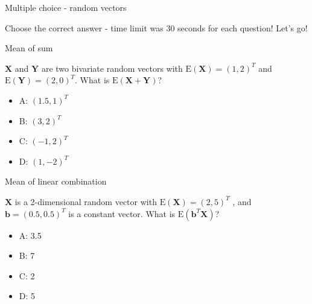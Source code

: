\documentclass[ignorenonframetext,]{beamer}
\providecommand{\tightlist}{%
  \setlength{\itemsep}{0pt}\setlength{\parskip}{0pt}}
\begin{document}
\begin{frame}

\begin{block}{Multiple choice - random vectors}

Choose the correct answer - time limit was 30 seconds for each question!
Let's go!

\begin{block}{Mean of sum}

\(\mathbf{X}\) and \(\mathbf{Y}\) are two bivariate random vectors with
\(\text{E}(\mathbf{X})=(1,2)^T\) and \(\text{E}(\mathbf{Y})=(2,0)^T\).
What is \(\text{E}(\mathbf{X}+\mathbf{Y})\)?

\begin{itemize}
\tightlist
\item
  A: \((1.5,1)^T\)
\item
  B: \((3,2)^T\)
\item
  C: \((-1,2)^ T\)
\item
  D: \((1,-2)^T\)
\end{itemize}

\end{block}

\end{block}

\end{frame}

\begin{frame}

\begin{block}{Mean of linear combination}

\(\mathbf{X}\) is a 2-dimensional random vector with
\(\text{E}(\mathbf{X})=(2,5)^T\) , and \(\mathbf{b}=(0.5, 0.5)^T\) is a
constant vector. What is \(\text{E}(\mathbf{b}^T\mathbf{X})\)?

\begin{itemize}
\tightlist
\item
  A: 3.5
\item
  B: 7
\item
  C: 2
\item
  D: 5
\end{itemize}

\end{block}

\end{frame}
\end{document}
